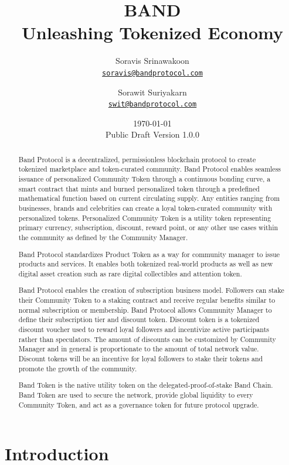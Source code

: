 \documentclass[letterpaper,11pt]{article}
\title{\LARGE BAND\\
    \Large Unleashing Tokenized Economy}
\author{
        Soravis Srinawakoon\\
        \small\href{mailto:soravis@bandprotocol.com}
            {\nolinkurl{soravis@bandprotocol.com}}
    \and
        Sorawit Suriyakarn\\
        \small\href{mailto:swit@bandprotocol.com}
            {\nolinkurl{swit@bandprotocol.com}}
    }
\date{\today\\\small Public Draft Version 1.0.0}
\begin{document}
\maketitle

\begin{abstract}

Band Protocol is a decentralized, permissionless blockchain protocol to create tokenized marketplace and token-curated community. Band Protocol enables seamless issuance of personalized Community Token through a continuous bonding curve, a smart contract that mints and burned personalized token through a predefined mathematical function based on current circulating supply. Any entities ranging from businesses, brands and celebrities can create a loyal token-curated community with personalized tokens. Personalized Community Token is a utility token representing primary currency, subscription, discount, reward point, or any other use cases within the community as defined by the Community Manager.

Band Protocol standardizes Product Token as a way for community manager to issue products and services. It enables both tokenized real-world products as well as new digital asset creation such as rare digital collectibles and attention token.

Band Protocol enables the creation of subscription business model. Followers can stake their Community Token to a staking contract and receive regular benefits similar to normal subscription or membership. Band Protocol allows Community Manager to define their subscription tier and discount token. Discount token is a tokenized discount voucher used to reward loyal followers and incentivize active participants rather than speculators. The amount of discounts can be customized by Community Manager and in general is proportionate to the amount of total network value. Discount tokens will be an incentive for loyal followers to stake their tokens and promote the growth of the community.

Band Token is the native utility token on the delegated-proof-of-stake Band Chain. Band Token are used to secure the network, provide global liquidity to every Community Token, and act as a governance token for future protocol upgrade.

\end{abstract}

\newpage
{
\hypersetup{linkcolor=black}
\tableofcontents
}
\newpage

\section{Introduction}
\end{document}
